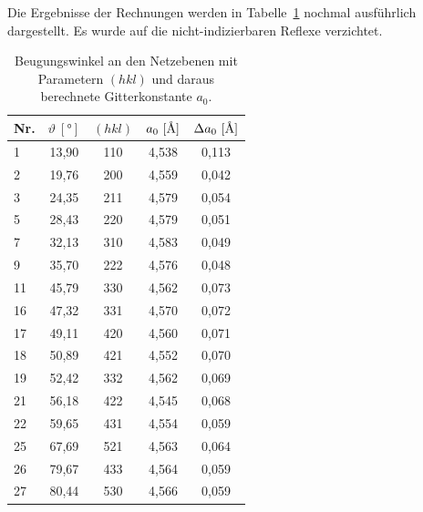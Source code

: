 \documentclass[a4paper,twoside,final]{article}
\begin{document}
Die Ergebnisse der Rechnungen werden in Tabelle~\ref{tab:Ergebnisse} nochmal ausführlich dargestellt. Es wurde auf die nicht-indizierbaren Reflexe verzichtet.
\begin{table}[ht]
	\centering
	\caption{Beugungswinkel an den Netzebenen mit Parametern $(hkl)$ und daraus berechnete Gitterkonstante $a_0$.}
	\label{tab:Ergebnisse}
	\begin{tabular}{l c c c c}
		\toprule
      Nr. & $\vartheta~[\si{\degree}]$ & $(hkl)$ & $a_0~[\si{\textup{\AA}}]$ & $\Delta a_0~[\si{\textup{\AA}}]$\\
    \midrule
    1  & 13,90 & 110 & 4,538 & 0,113 \\
    2  & 19,76 & 200 & 4,559 & 0,042 \\
    3  & 24,35 & 211 & 4,579 & 0,054 \\
    5  & 28,43 & 220 & 4,579 & 0,051 \\
    7  & 32,13 & 310 & 4,583 & 0,049 \\
    9  & 35,70 & 222 & 4,576 & 0,048 \\
    11 & 45,79 & 330 & 4,562 & 0,073 \\
    16 & 47,32 & 331 & 4,570 & 0,072 \\
    17 & 49,11 & 420 & 4,560 & 0,071 \\
    18 & 50,89 & 421 & 4,552 & 0,070 \\
    19 & 52,42 & 332 & 4,562 & 0,069 \\
    21 & 56,18 & 422 & 4,545 & 0,068 \\
    22 & 59,65 & 431 & 4,554 & 0,059 \\
    25 & 67,69 & 521 & 4,563 & 0,064 \\
    26 & 79,67 & 433 & 4,564 & 0,059 \\
    27 & 80,44 & 530 & 4,566 & 0,059
	\end{tabular}
\end{table}
\end{document}
